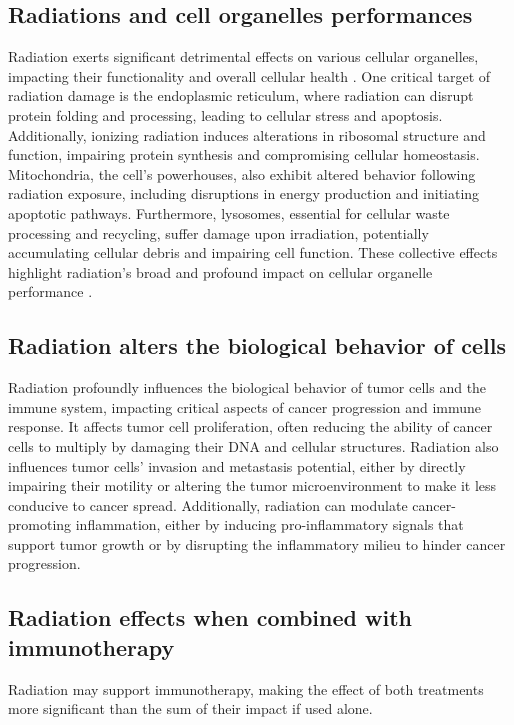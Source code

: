 \subsection{Radiations and cell organelles performances}
Radiation exerts significant detrimental effects on various cellular organelles, impacting their functionality and overall cellular health \cite{Somosy2000}.
One critical target of radiation damage is the endoplasmic reticulum, where radiation can disrupt protein folding and processing, leading to cellular stress and apoptosis.
Additionally, ionizing radiation induces alterations in ribosomal structure and function, impairing protein synthesis and compromising cellular homeostasis.
Mitochondria, the cell's powerhouses, also exhibit altered behavior following radiation exposure, including disruptions in energy production and initiating apoptotic pathways.
Furthermore, lysosomes, essential for cellular waste processing and recycling, suffer damage upon irradiation, potentially accumulating cellular debris and impairing cell function.
These collective effects highlight radiation's broad and profound impact on cellular organelle performance \cite{Wang2018}.

\subsection{Radiation alters the biological behavior of cells}
Radiation profoundly influences the biological behavior of tumor cells and the immune system, impacting critical aspects of cancer progression and immune response.
It affects tumor cell proliferation, often reducing the ability of cancer cells to multiply by damaging their DNA and cellular structures.
Radiation also influences tumor cells' invasion and metastasis potential, either by directly impairing their motility or altering the tumor microenvironment to make it less conducive to cancer spread.
Additionally, radiation can modulate cancer-promoting inflammation, either by inducing pro-inflammatory signals that support tumor growth or by disrupting the inflammatory milieu to hinder cancer progression.

\subsection{Radiation effects when combined with immunotherapy}
Radiation may support immunotherapy, making the effect of both treatments more significant than the sum of their impact if used alone.

